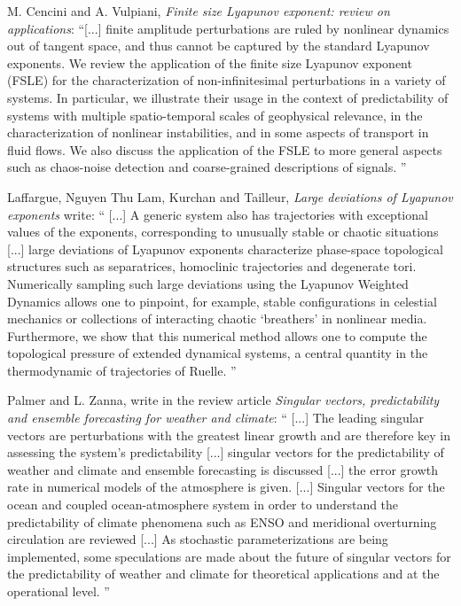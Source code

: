 \begin{description}
M. Cencini and A. Vulpiani, {\em Finite size {Lyapunov}
exponent: review on applications}: ``[...] finite amplitude perturbations
 are ruled by nonlinear
dynamics out of tangent space, and thus cannot be captured by the
standard Lyapunov exponents. We review the application of the finite
size Lyapunov exponent (FSLE) for the characterization of
non-infinitesimal perturbations in a variety of systems. In particular,
we illustrate their usage in the context of predictability of systems
with multiple spatio-temporal scales of geophysical relevance, in the
characterization of nonlinear instabilities, and in some aspects of
transport in fluid flows. We also discuss the application of the FSLE
to more general aspects such as chaos-noise detection and
coarse-grained descriptions of signals.
''

Laffargue, Nguyen Thu Lam, Kurchan  and Tailleur,
{\em Large deviations of {Lyapunov} exponents} write: ``
[...] A generic system also has trajectories with exceptional
  values of the exponents, corresponding to unusually stable or chaotic
  situations [...] large deviations of
  Lyapunov exponents characterize phase-space topological structures such
  as separatrices, homoclinic trajectories and degenerate tori.
  Numerically sampling such large deviations using the Lyapunov Weighted
  Dynamics allows one to pinpoint, for example, stable configurations in
  celestial mechanics or collections of interacting chaotic `breathers'
  in nonlinear media. Furthermore, we show that this numerical method
  allows one to compute the topological pressure of extended dynamical
  systems, a central quantity in the thermodynamic of trajectories of
  Ruelle.
''

Palmer and L. Zanna, write in the review article
{\em Singular vectors, predictability and
         ensemble forecasting for weather and climate}: ``
[...] The leading singular vectors are perturbations with the
  greatest linear growth and are therefore key in assessing the system's
  predictability [...] singular vectors for the
  predictability of weather and climate and ensemble forecasting is
  discussed [...] the error growth rate in numerical models of the atmosphere is
  given. [...] Singular vectors for the ocean and coupled
  ocean-atmosphere system in order to understand the predictability of
  climate phenomena such as ENSO and meridional overturning circulation
  are reviewed [...] As stochastic parameterizations are being
  implemented, some speculations are made about the future of singular
  vectors for the predictability of weather and climate for theoretical
  applications and at the operational level.
''


\end{description}
